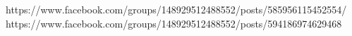  
 
 
 
 

https://www.facebook.com/groups/148929512488552/posts/585956115452554/
https://www.facebook.com/groups/148929512488552/posts/594186974629468

